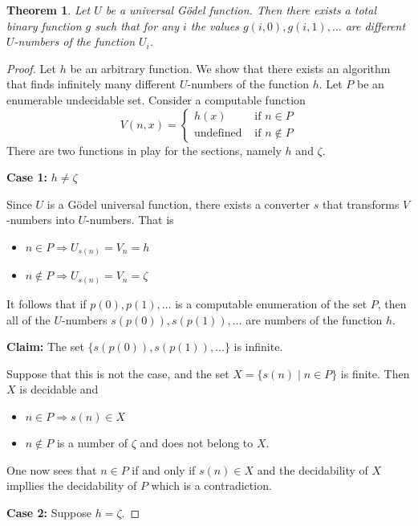 \documentclass[10pt, letterpaper]{article}
\newtheorem{thm}{Theorem}
\theoremstyle{remark}
\theoremstyle{definition}
\begin{document}
\begin{thm}
    Let $U$ be a universal G\"{o}del function. Then there exists a total binary function $g$ such that for any $i$ the values 
    $g(i,0), g(i,1), \ldots$ are different $U$-numbers of the function $U_i$.
\end{thm}

\begin{proof}
    Let $h$ be an arbitrary function. We show that there exists an algorithm that finds infinitely many different $U$-numbers of the function $h$.
    Let $P$ be an enumerable undecidable set. Consider a computable function 
    \[
        V(n,x) = \begin{cases}
            h(x) &\text{ if } n \in P \\
            \text{undefined} &\text{ if } n \notin P 
        \end{cases}
    \]
    There are two functions in play for the sections, namely $h$ and $\zeta$.

    \textbf{Case 1:} $h \neq \zeta$

    Since $U$ is a G\"{o}del universal function, there exists a converter $s$ that transforms $V$-numbers into $U$-numbers. That is 
    \begin{itemize}
        \item $n \in P \Rightarrow U_{s(n)} = V_n = h$
        \item $n \notin P \Rightarrow U_{s(n)} = V_n = \zeta$
    \end{itemize}
    It follows that if $p(0), p(1), \ldots$ is a computable enumeration of the set $P$, then all of the $U$-numbers $s(p(0)), s(p(1)), \ldots$ 
    are numbers of the function $h$.

    \textbf{Claim: } The set $\{s(p(0)), s(p(1)), \ldots\}$ is infinite.

    Suppose that this is not the case, and the set $X =\{s(n) \mid n \in P\}$ is finite. Then $X$ is decidable and 
    \begin{itemize}
        \item $n \in P \Rightarrow s(n) \in X$
        \item $n \notin P$ is a number of $\zeta$ and does not belong to $X$.
    \end{itemize}
    One now sees that $n \in P$ if and only if $s(n) \in X$ and the decidability of $X$ impllies the decidability of $P$ which is a 
    contradiction.

    \textbf{Case 2: } Suppose $h = \zeta$.


\end{proof}
\end{document}
